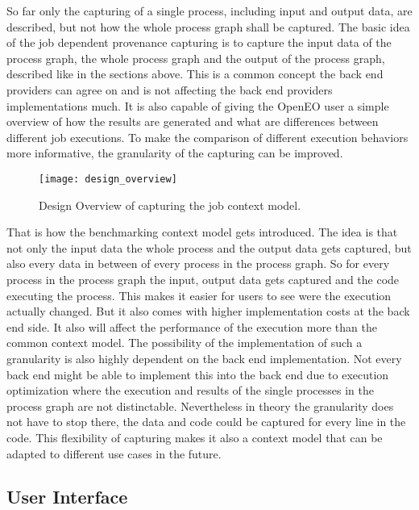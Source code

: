 \documentclass[draft,final]{vutinfth} %
\begin{document}
So far only the capturing of a single process, including input and output data, are described, but not how the whole process graph shall be captured. The basic idea of the job dependent provenance capturing is to capture the input data of the process graph, the whole process graph and the output of the process graph, described like in the sections above. This is a common concept the back end providers can agree on and is not affecting the back end providers implementations much. It is also capable of giving the OpenEO user a simple overview of how the results are generated and what are differences between different job executions. 
To make the comparison of different execution behaviors more informative, the granularity of the capturing can be improved. 

\begin{figure}[h]
	\centering
	\texttt{[image: design\_overview]}
	\caption{Design Overview of capturing the job context model.}
	\label{fig:design_overview} %
\end{figure}
That is how the benchmarking context model gets introduced. The idea is that not only the input data the whole process and the output data gets captured, but also every data in between of every process in the process graph. So for every process in the process graph the input, output data gets captured and the code executing the process. This makes it easier for users to see were the execution actually changed. But it also comes with higher implementation costs at the back end side. It also will affect the performance of the execution more than the common context model. The possibility of the implementation of such a granularity is also highly dependent on the back end implementation. Not every back end might be able to implement this into the back end due to execution optimization where the execution and results of the single  processes in the process graph are not distinctable. Nevertheless in theory the granularity does not have to stop there, the data and code could be captured for every line in the code. This flexibility of capturing makes it also a context model that  can be adapted to different use cases in the future.  

\subsection{User Interface}\label{Design:User Interface}
\end{document}
